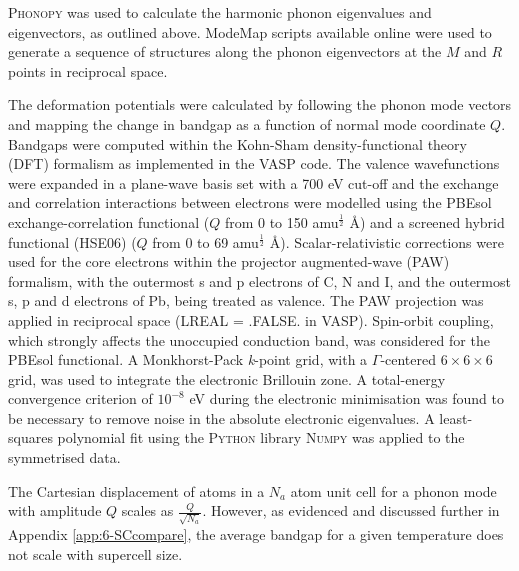 \textsc{Phonopy}\autocite{Togo2015} was used to calculate the harmonic phonon eigenvalues and eigenvectors, as outlined above. ModeMap scripts available online\autocite{ModeMap} were used to generate a sequence of structures along the phonon eigenvectors at the $M$ and $R$ points in reciprocal space. 

The deformation potentials were calculated by following the phonon mode vectors and mapping the change in bandgap as a function of normal mode coordinate $Q$.
Bandgaps were computed within the Kohn-Sham density-functional theory (DFT) formalism as implemented in the \textsc{VASP} code.\autocite{Kresse1996a}
The valence wavefunctions were expanded in a plane-wave basis set with a 700 eV cut-off and the exchange and correlation interactions between electrons were modelled using the PBEsol exchange-correlation functional\autocite{Perdew2008a} ($Q$ from 0 to 150 amu$^{\frac{1}{2}}$ \AA) and a screened hybrid functional (HSE06)\autocite{Heyd2004a,Heyd2005a} ($Q$ from 0 to 69 amu$^{\frac{1}{2}}$ \AA).
Scalar-relativistic corrections were used for the core electrons within the projector augmented-wave (PAW) formalism,\autocite{Blochl1994} with the outermost s and p electrons of C, N and I, and the outermost s, p and d electrons of Pb, being treated as valence. 
The PAW projection was applied in reciprocal space (\textsc{LREAL = .FALSE.} in \textsc{VASP}).
Spin-orbit coupling, which strongly affects the unoccupied conduction band, was considered for the PBEsol functional.
A Monkhorst-Pack \textit{k}-point grid, with a $\Gamma$-centered $6 \times 6 \times 6$ grid, was used to integrate the electronic Brillouin zone.
A total-energy convergence criterion of $10^{-8}$ eV during the electronic minimisation was found to be necessary to remove noise in the absolute electronic eigenvalues.
A least-squares polynomial fit using the \textsc{Python} library \textsc{Numpy} was applied to the symmetrised data.

The Cartesian displacement of atoms in a $N_a$ atom unit cell for a phonon mode with amplitude $Q$ scales as $\frac{Q}{\sqrt{N_a}}$.\autocite{} %
However, as evidenced and discussed further in Appendix \ref{app:6-SCcompare}, the average bandgap for a given temperature does not scale with supercell size.

